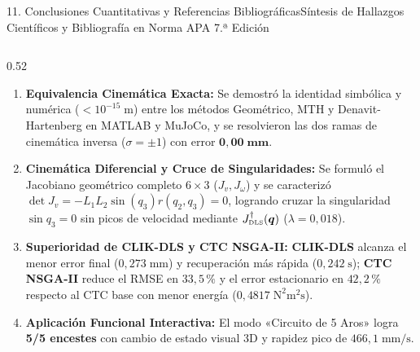 \documentclass[aspectratio=169,10pt,xcolor=table]{beamer}
\newcommand{\Jdls}{J^{\dagger}_{\text{\tiny DLS}}}
\begin{document}
\begin{frame}{11. Conclusiones Cuantitativas y Referencias Bibliográficas}{Síntesis de Hallazgos Científicos y Bibliografía en Norma APA 7.ª Edición}
\begin{columns}[T,totalwidth=\textwidth]
  \begin{column}{0.52\textwidth}
    \begin{cajaidea}
      \fontsize{6.4}{7.7}\selectfont
      \begin{enumerate}\setlength{\itemsep}{1.0pt}
        \item \textbf{Equivalencia Cinemática Exacta:} Se demostró la identidad simbólica y numérica ($<10^{-15}\;\text{m}$) entre los métodos Geométrico, MTH y Denavit-Hartenberg en MATLAB y MuJoCo, y se resolvieron las dos ramas de cinemática inversa ($\sigma=\pm 1$) con error $\mathbf{0{,}00\;\text{mm}}$.
        \item \textbf{Cinemática Diferencial y Cruce de Singularidades:} Se formuló el Jacobiano geométrico completo $6\times 3$ ($J_v, J_\omega$) y se caracterizó $\det J_v = -L_1 L_2\sin(q_3)r(q_2,q_3)=0$, logrando cruzar la singularidad $\sin q_3=0$ sin picos de velocidad mediante $\Jdls(\bm{q})$ ($\lambda=0{,}018$).
        \item \textbf{Superioridad de CLIK-DLS y CTC NSGA-II:} \textbf{CLIK-DLS} alcanza el menor error final ($0{,}273\;\text{mm}$) y recuperación más rápida ($0{,}242\;\text{s}$); \textbf{CTC NSGA-II} reduce el RMSE en $33{,}5\,\%$ y el error estacionario en $42{,}2\,\%$ respecto al CTC base con menor energía ($0{,}4817\;\text{N}^2\text{m}^2\text{s}$).
        \item \textbf{Aplicación Funcional Interactiva:} El modo «Circuito de 5 Aros» logra \textbf{5/5 encestes} con cambio de estado visual 3D y rapidez pico de $466{,}1\;\text{mm/s}$.
      \end{enumerate}
    \end{cajaidea}
  \end{column}


\end{columns}
\end{frame}
\end{document}
